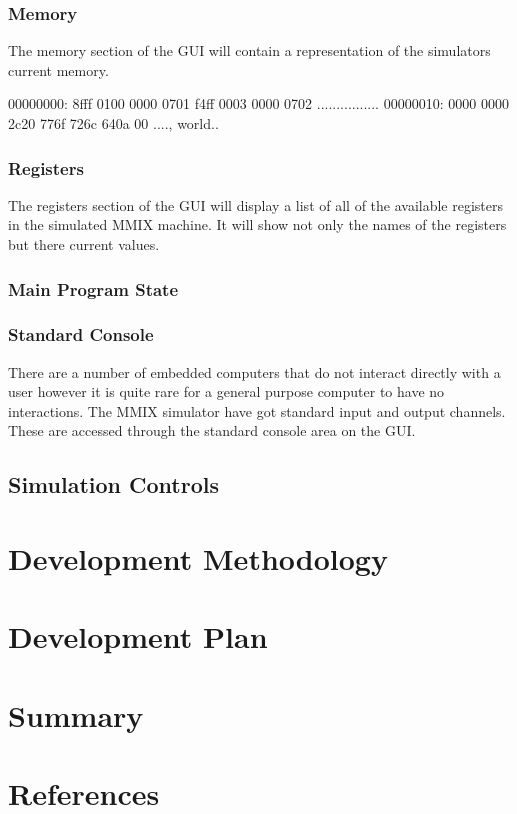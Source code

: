 \documentclass[11pt]{article} %
\begin{document}
\subsubsection{Memory}
The memory section of the GUI will contain a representation of the simulators current memory.


00000000: 8fff 0100 0000 0701 f4ff 0003 0000 0702 ................
00000010: 0000 0000 2c20 776f 726c 640a 00        ...., world..

\subsubsection{Registers}
The registers section of the GUI will display a list of all of the available registers in the simulated MMIX machine.  It will show not only the names of the registers but there current values.  
\subsubsection{Main Program State}
\subsubsection{Standard Console}
There are a number of embedded computers that do not interact directly with a user however it is quite rare for a general purpose computer to have no interactions.  The MMIX simulator have got standard input and output channels.  These are accessed through the standard console area on the GUI.
\subsection{Simulation Controls}

\section{Development Methodology}


\section{Development Plan}


\section{Summary}


\section{References}
\end{document}
